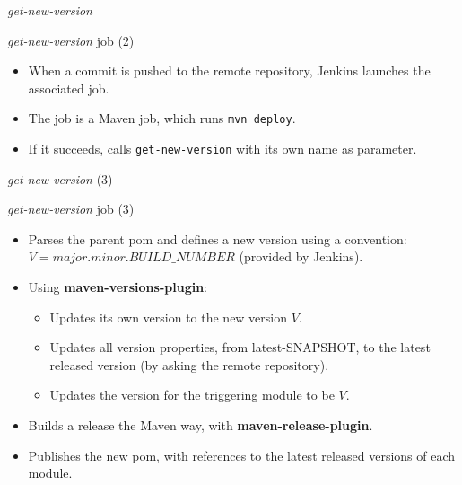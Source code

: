 \documentclass[presentation]{beamer}
\begin{document}
{
\begin{frame}[label=sec-3-4]{\textit{get-new-version}}

\begin{block}{\textit{get-new-version} job (2)}

\begin{itemize}
\item When a commit is pushed to the remote repository, Jenkins launches the associated job.
\item The job is a Maven job, which runs \texttt{mvn deploy}.
\item If it succeeds, calls \texttt{get-new-version} with its own name as parameter.
\end{itemize}
\end{block}
\end{frame}} %

{
\begin{frame}[label=sec-3-5]{\textit{get-new-version} (3)}

\begin{block}{\textit{get-new-version} job (3)}

\begin{itemize}
\item Parses the parent pom and defines a new version using a convention: $V = major.minor.BUILD\_NUMBER$ (provided by Jenkins).
\item Using \textbf{maven-versions-plugin}:
\begin{itemize}
\item Updates its own version to the new version $V$.
\item Updates all version properties, from latest-SNAPSHOT, to the latest released version (by asking the remote repository).
\item Updates the version for the triggering module to be $V$.
\end{itemize}
\item Builds a release the Maven way, with \textbf{maven-release-plugin}.
\item Publishes the new pom, with references to the latest released versions of each module.
\end{itemize}
\end{block}
\end{frame}} %
\end{document}
